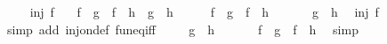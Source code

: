 \begin{isabellebody}
\isamarkupfalse%
\ \isanewline
\ \ \ {\isachardoublequoteopen}inj\ f{\isachardoublequoteclose}\isanewline
\ \ \ {\isachardoublequoteopen}{\isacharparenleft}f\ {\isasymcirc}\ g\ {\isacharequal}\ f\ {\isasymcirc}\ h{\isacharparenright}\ {\isacharequal}\ {\isacharparenleft}g\ {\isacharequal}\ h{\isacharparenright}{\isachardoublequoteclose}\isanewline
%
\isadelimproof
%
\endisadelimproof
%
\isatagproof
{}\isamarkupfalse%
\ \isanewline
\ \ \isamarkupfalse%
\ {\isachardoublequoteopen}f\ {\isasymcirc}\ g\ {\isacharequal}\ f\ {\isasymcirc}\ h{\isachardoublequoteclose}\ \isanewline
\ \ \isamarkupfalse%
\ \isamarkupfalse%
\ {\isachardoublequoteopen}g\ {\isacharequal}\ h{\isachardoublequoteclose}\ \isamarkupfalse%
\ {\isacharbackquoteopen}inj\ f{\isacharbackquoteclose}\ \isamarkupfalse%
\ {\isacharparenleft}simp\ add{\isacharcolon}\ inj{\isacharunderscore}on{\isacharunderscore}def\ fun{\isacharunderscore}eq{\isacharunderscore}iff{\isacharparenright}\ \isanewline
{}\isamarkupfalse%
\isanewline
\ \ \isamarkupfalse%
\ {\isachardoublequoteopen}g\ {\isacharequal}\ h{\isachardoublequoteclose}\ \isanewline
\ \ \isamarkupfalse%
\ \isamarkupfalse%
\ {\isachardoublequoteopen}f\ {\isasymcirc}\ g\ {\isacharequal}\ f\ {\isasymcirc}\ h{\isachardoublequoteclose}\ \isamarkupfalse%
\ simp\isanewline
{}\isamarkupfalse%
\isanewline
%
\endisatagproof
{\isafoldproof}%
%
\isadelimproof
%
\endisadelimproof
%
\isadelimtheory
%
\endisadelimtheory
%
\isatagtheory
%
\endisatagtheory
{\isafoldtheory}%
%
\isadelimtheory
%
\endisadelimtheory
%
\end{isabellebody}%
\endinput
